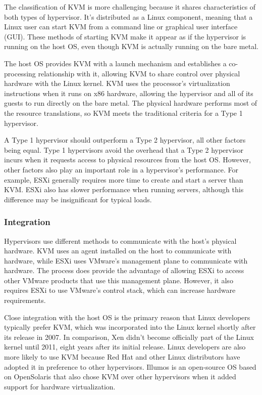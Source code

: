 \documentclass[14pt]{extreport}
\begin{document}
The classification of KVM is more challenging because it shares characteristics of both types of hypervisor. It’s distributed as a Linux component, meaning that a Linux user can start KVM from a command line or graphical user interface (GUI). These methods of starting KVM make it appear as if the hypervisor is running on the host OS, even though KVM is actually running on the bare metal.

The host OS provides KVM with a launch mechanism and establishes a co-processing relationship with it, allowing KVM to share control over physical hardware with the Linux kernel. KVM uses the processor’s virtualization instructions when it runs on x86 hardware, allowing the hypervisor and all of its guests to run directly on the bare metal. The physical hardware performs most of the resource translations, so KVM meets the traditional criteria for a Type 1 hypervisor.

A Type 1 hypervisor should outperform a Type 2 hypervisor, all other factors being equal. Type 1 hypervisors avoid the overhead that a Type 2 hypervisor incurs when it requests access to physical resources from the host OS. However, other factors also play an important role in a hypervisor’s performance. For example, ESXi generally requires more time to create and start a server than KVM. ESXi also has slower performance when running servers, although this difference may be insignificant for typical loads.
\subsubsection{Integration}
Hypervisors use different methods to communicate with the host’s physical hardware. KVM uses an agent installed on the host to communicate with hardware, while ESXi uses VMware’s management plane to communicate with hardware. The process does provide the advantage of allowing ESXi to access other VMware products that use this management plane. However, it also requires ESXi to use VMware’s control stack, which can increase hardware requirements.

Close integration with the host OS is the primary reason that Linux developers typically prefer KVM, which was incorporated into the Linux kernel shortly after its release in 2007. In comparison, Xen didn’t become officially part of the Linux kernel until 2011, eight years after its initial release. Linux developers are also more likely to use KVM because Red Hat and other Linux distributors have adopted it in preference to other hypervisors. Illumos is an open-source OS based on OpenSolaris that also chose KVM over other hypervisors when it added support for hardware virtualization.
\end{document}
